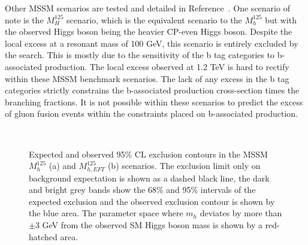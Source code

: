 Other \ac{MSSM} scenarios are tested and detailed in Reference~\cite{CMS:2022rbd}.
One scenario of note is the $M_{H}^{125}$ scenario, which is the equivalent scenario to the $M_{h}^{125}$ but with the observed Higgs boson being the heavier \ac{CP}-even Higgs boson.
Despite the local excess at a resonant mass of 100 GeV, this scenario is entirely excluded by the search. 
This is mostly due to the sensitivity of the b tag categories to b-associated production.
The local excess observed at 1.2 TeV is hard to rectify within these \ac{MSSM} benchmark scenarios.
The lack of any excess in the b tag categories strictly constrains the b-associated production cross-section times the branching fractions.
It is not possible within these scenarios to predict the excess of gluon fusion events within the constraints placed on b-associated production. \\

\begin{figure}[!hbtp]
\centering
     \\
\caption[Plots of the model-dependent limits in MSSM benchamrk scenarios.]{Expected and observed 95\% CL exclusion contours in the MSSM $M_{h}^{125}$ (a) and $M_{h,EFT}^{125}$ (b) scenarios. The exclusion limit only on background expectation is shown as a dashed black line, the dark and bright grey bands show the 68\% and 95\% intervals of the expected exclusion and the observed exclusion contour is shown by the blue area. The parameter space where $m_{h}$ deviates by more than $\pm$3  GeV from the observed SM Higgs boson mass is shown by a red-hatched area.~\cite{CMS:2022rbd}
}
\label{fig:mssm_limits}
\end{figure}

